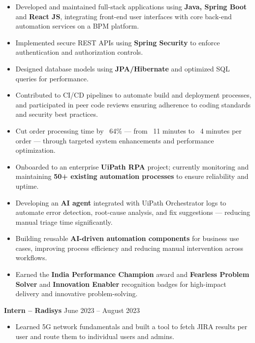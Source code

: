 \documentclass[10pt]{article}
\begin{document}
\begin{itemize}[leftmargin=*, itemsep=2pt]
\item Developed and maintained full-stack applications using \textbf{Java, Spring Boot} and \textbf{React JS}, integrating front-end user interfaces with core back-end automation services on a BPM platform.
\item Implemented secure REST APIs using \textbf{Spring Security} to enforce authentication and authorization controls.
\item Designed database models using \textbf{JPA/Hibernate} and optimized SQL queries for performance.
\item Contributed to CI/CD pipelines to automate build and deployment processes, and participated in peer code reviews ensuring adherence to coding standards and security best practices.
\item Cut order processing time by ~64\% — from ~11 minutes to ~4 minutes per order — through targeted system enhancements and performance optimization.
\item Onboarded to an enterprise \textbf{UiPath RPA} project; currently monitoring and maintaining \textbf{50+ existing automation processes} to ensure reliability and uptime.
\item Developing an \textbf{AI agent} integrated with UiPath Orchestrator logs to automate error detection, root-cause analysis, and fix suggestions — reducing manual triage time significantly.
\item Building reusable \textbf{AI-driven automation components} for business use cases, improving process efficiency and reducing manual intervention across workflows.
\item Earned the \textbf{India Performance Champion} award and \textbf{Fearless Problem Solver} and \textbf{Innovation Enabler} recognition badges for high-impact delivery and innovative problem-solving.
\end{itemize}

\vspace{3pt}

\textbf{Intern -- Radisys} \hfill June 2023 -- August 2023
\begin{itemize}[leftmargin=*, itemsep=2pt]
\item Learned 5G network fundamentals and built a tool to fetch JIRA results per user and route them to individual users and admins.
\end{itemize}

\vspace{3pt}
\end{document}
